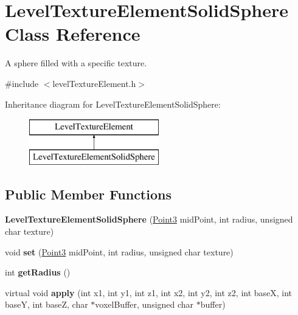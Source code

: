 \hypertarget{classLevelTextureElementSolidSphere}{
\section{\-Level\-Texture\-Element\-Solid\-Sphere \-Class \-Reference}
\label{d7/ded/classLevelTextureElementSolidSphere}
}


\-A sphere filled with a specific texture.  




{\ttfamily \#include $<$level\-Texture\-Element.\-h$>$}

\-Inheritance diagram for \-Level\-Texture\-Element\-Solid\-Sphere\-:\begin{figure}[H]
\begin{center}
\leavevmode
\includegraphics[height=2.000000cm]{d7/ded/classLevelTextureElementSolidSphere}
\end{center}
\end{figure}
\subsection*{\-Public \-Member \-Functions}
\begin{DoxyCompactItemize}
\item 
\hypertarget{classLevelTextureElementSolidSphere_a4a0e0028212dadca06a530726de05672}{
{\bfseries \-Level\-Texture\-Element\-Solid\-Sphere} (\hyperlink{classPoint3}{\-Point3} mid\-Point, int radius, unsigned char texture)}
\label{d7/ded/classLevelTextureElementSolidSphere_a4a0e0028212dadca06a530726de05672}

\item 
\hypertarget{classLevelTextureElementSolidSphere_a79c7cc442f0f1ae3ddbfcec8036b60bc}{
void {\bfseries set} (\hyperlink{classPoint3}{\-Point3} mid\-Point, int radius, unsigned char texture)}
\label{d7/ded/classLevelTextureElementSolidSphere_a79c7cc442f0f1ae3ddbfcec8036b60bc}

\item 
\hypertarget{classLevelTextureElementSolidSphere_ad032848b67d0d871f1795669c18250f8}{
int {\bfseries get\-Radius} ()}
\label{d7/ded/classLevelTextureElementSolidSphere_ad032848b67d0d871f1795669c18250f8}

\item 
\hypertarget{classLevelTextureElementSolidSphere_a6ad721953aeff4105b46f7bcb8a45d6d}{
virtual void {\bfseries apply} (int x1, int y1, int z1, int x2, int y2, int z2, int base\-X, int base\-Y, int base\-Z, char $\ast$voxel\-Buffer, unsigned char $\ast$buffer)}
\label{d7/ded/classLevelTextureElementSolidSphere_a6ad721953aeff4105b46f7bcb8a45d6d}

\end{DoxyCompactItemize}
